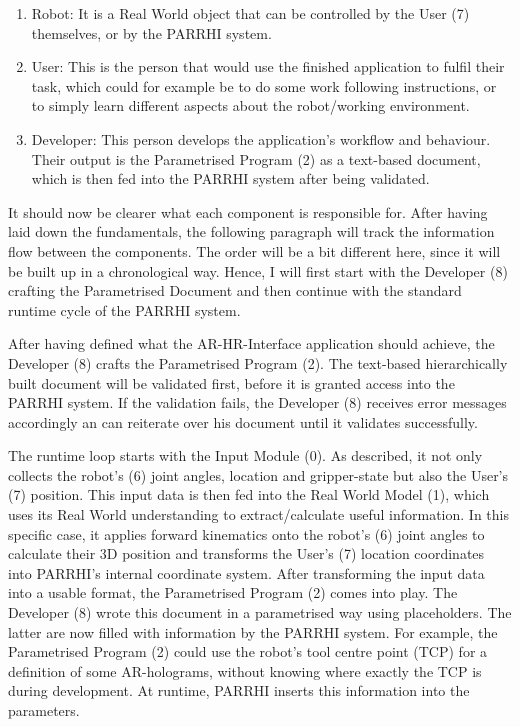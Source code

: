 \begin{enumerate}
	\item Robot: It is a Real World object that can be controlled by the User (7) themselves, or by the PARRHI system.
	\item User: This is the person that would use the finished application to fulfil their task, which could for example be to do some work following instructions, or to simply learn different aspects about the robot/working environment.
	\item Developer: This person develops the application's workflow and behaviour. Their output is the Parametrised Program (2) as a text-based document, which is then fed into the PARRHI system after being validated. 
\end{enumerate}

It should now be clearer what each component is responsible for. After having laid down the fundamentals, the following paragraph will track the information flow between the components. The order will be a bit different here, since it will be built up in a chronological way. Hence, I will first start with the Developer (8) crafting the Parametrised Document and then continue with the standard runtime cycle of the PARRHI system.

After having defined what the AR-HR-Interface application should achieve, the Developer (8) crafts the Parametrised Program (2). The text-based hierarchically built document will be validated first, before it is granted access into the PARRHI system. If the validation fails, the Developer (8) receives error messages accordingly an can reiterate over his document until it validates successfully.

The runtime loop starts with the Input Module (0). As described, it not only collects the robot's (6) joint angles, location and gripper-state but also the User's (7) position. This input data is then fed into the Real World Model (1), which uses its Real World understanding to extract/calculate useful information. In this specific case, it applies forward kinematics onto the robot's (6) joint angles to calculate their 3D position and transforms the User's (7) location coordinates into PARRHI's internal coordinate system. After transforming the input data into a usable format, the Parametrised Program (2) comes into play. The Developer (8) wrote this document in a parametrised way using placeholders. The latter are now filled with information by the PARRHI system. For example, the Parametrised Program (2) could use the robot's tool centre point (TCP) for a definition of some AR-holograms, without knowing where exactly the TCP is during development. At runtime, PARRHI inserts this information into the parameters. 

